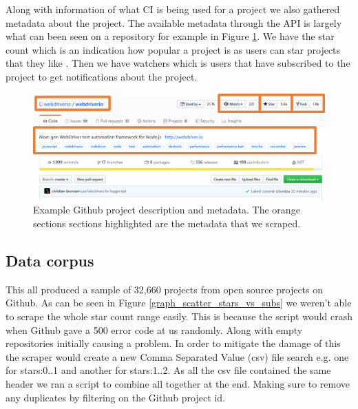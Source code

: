\documentclass[10pt,conference]{IEEEtran}
\begin{document}
Along with information of what CI is being used for a project we also gathered metadata about the project. The available metadata through the API is largely what can been seen on a repository for example in Figure \ref{ExampleGithubMetaData}. We have the star count which is an indication how popular a project is as users can star projects that they like \citet{Borges2016}. Then we have watchers which is users that have subscribed to the project to get notifications about the project. 

\begin{figure}[h]
  \centering
  \includegraphics[scale=0.5, width=\textwidth]{readme metadata example.png}
  \caption[alt text]{Example Github project description and metadata\cite{GithubMetaDataExample}. The orange sections sections highlighted are the metadata that we scraped.}
  \label{ExampleGithubMetaData}
\end{figure}

\vspace*{-0.05in}
\subsection{Data corpus}
\label{section:corpus}
\vspace*{-0.05in}
This all produced a sample of 32,660 projects from open source projects on Github. As can be seen in Figure \ref{graph_scatter_stars_vs_subs} we weren't able to scrape the whole star count range easily. This is because the script would crash when Github gave a 500 error code at us randomly. Along with empty repositories initially causing a problem. In order to mitigate the damage of this the scraper would create a new Comma Separated Value (csv) file search e.g. one for stars:0..1 and another for stars:1..2. As all the csv file contained the same header we ran a script to combine all together at the end. Making sure to remove any duplicates by filtering on the Github project id.
\end{document}
